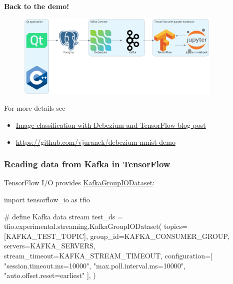 \documentclass[10pt,utf8]{beamer}
\begin{document}
\begin{frame}
    \vspace*{1cm}
    \centering
    \textbf{\huge{Back to the demo!}}
    
    \vspace*{0.5cm}
    
    \begin{figure}
        \includegraphics[height=4cm]{./img/qt_to_tf.eps}
    \end{figure}
    
    \vspace*{0.5cm}
    
    For more details see
    \begin{itemize}
        \color{blue}
        \item \href{https://debezium.io/blog/2023/05/02/tensorflow-mnist-classification}{Image classification with Debezium and TensorFlow blog post}
        \item \href{https://github.com/vjuranek/debezium-mnist-demo}{https://github.com/vjuranek/debezium-mnist-demo}
        \color{black}
    \end{itemize}
\end{frame}

\begin{frame}[fragile]
    \frametitle{Reading data from Kafka in TensorFlow}
    TensorFlow I/O provides \textcolor{blue}{\href{https://www.tensorflow.org/io/api_docs/python/tfio/experimental/streaming/KafkaGroupIODataset}{KafkaGroupIODataset}}:
    
    \vspace{0.5cm}
    
    \footnotesize
    \begin{python}
import tensorflow_io as tfio
    
# define Kafka data stream
test_ds = tfio.experimental.streaming.KafkaGroupIODataset(
    topics=[KAFKA_TEST_TOPIC],
    group_id=KAFKA_CONSUMER_GROUP,
    servers=KAFKA_SERVERS,
    stream_timeout=KAFKA_STREAM_TIMEOUT,
    configuration=[
        "session.timeout.ms=10000",
        "max.poll.interval.ms=10000",
        "auto.offset.reset=earliest"
    ],
)
    \end{python}
\end{frame}
\end{document}
